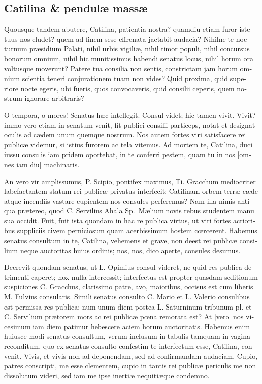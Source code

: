 \documentclass[10pt, twoside]{lecturenotes}
\begin{document}
\newpage
\begin{latin}
\section*{Catilina \& pendulæ massæ}
Quousque tandem abutere, Catilina, patientia nostra? quamdiu etiam furor iste tuus nos eludet? quem ad finem sese effrenata jactabit audacia? Nihilne te nocturnum præsidium Palati, nihil urbis vigiliæ, nihil timor populi, nihil concursus bonorum omnium, nihil hic munitissimus habendi senatus locus, nihil horum ora voltusque moverunt? Patere tua consilia non sentis, constrictam jam horum omnium scientia teneri conjurationem tuam non vides? Quid proxima, quid superiore nocte egeris, ubi fueris, quos convocaveris, quid consilii ceperis, quem nostrum ignorare arbitraris?

O tempora, o mores! Senatus hæc intellegit. Consul videt; hic tamen vivit. Vivit? immo vero etiam in senatum venit, fit publici consilii particeps, notat et designat oculis ad cædem unum quemque nostrum. Nos autem fortes viri satisfacere rei publicæ videmur, si istius furorem ac tela vitemus. Ad mortem te, Catilina, duci iussu consulis iam pridem oportebat, in te conferri pestem, quam tu in nos [omnes iam diu] machinaris.

An vero vir amplissumus, P. Scipio, pontifex maximus, Ti. Gracchum mediocriter labefactantem statum rei publicæ privatus interfecit; Catilinam orbem terræ cæde atque incendiis vastare cupientem nos consules perferemus? Nam illa nimis antiqua prætereo, quod C. Servilius Ahala Sp.\ Mælium novis rebus studentem manu sua occidit. Fuit, fuit ista quondam in hac re publica virtus, ut viri fortes acrioribus suppliciis civem perniciosum quam acerbissimum hostem cœrcerent. Habemus senatus consultum in te, Catilina, vehemens et grave, non deest rei publicæ consilium neque auctoritas huius ordinis; nos, nos, dico aperte, consules desumus.

Decrevit quondam senatus, ut L. Opimius consul videret, ne quid res publica detrimenti caperet; nox nulla intercessit; interfectus est propter quasdam seditionum suspiciones C. Gracchus, clarissimo patre, avo, maioribus, occisus est cum liberis M. Fulvius consularis. Simili senatus consulto C. Mario et L. Valerio consulibus est permissa res publica; num unum diem postea L. Saturninum tribunum pl. et C. Servilium prætorem mors ac rei publicæ pœna remorata est? At [vero] nos vicesimum iam diem patimur hebescere aciem horum auctoritatis. Habemus enim huiusce modi senatus consultum, verum inclusum in tabulis tamquam in vagina reconditum, quo ex senatus consulto confestim te interfectum esse, Catilina, convenit. Vivis, et vivis non ad deponendam, sed ad confirmandam audaciam. Cupio, patres conscripti, me esse clementem, cupio in tantis rei publicæ periculis me non dissolutum videri, sed iam me ipse inertiæ nequitiæque condemno.


\end{latin}
\end{document}
